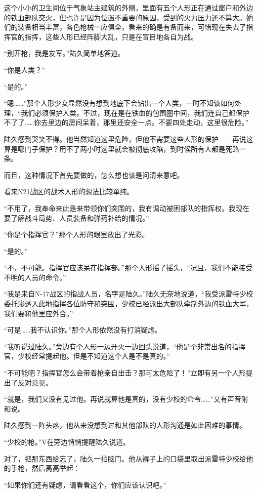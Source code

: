 这个小小的卫生间位于气象站主建筑的外侧，里面有五个人形正在通过窗户和外边的铁血部队交火，但也许是因为位置不重要的原因，受到的火力压力还不算大。她们的装备相当丰富，各色枪械一应俱全，看来的确是有备而来，可惜现在失去了指挥官的指挥，这些人形已经阵脚大乱，只是在盲目地各自为战。

“别开枪，我是友军。”陆久简单地答道。

“你是人类？”

“是的。”

“嗯……”那个人形少女显然没有想到地底下会钻出一个人类，一时不知该如何处理，“我们必须保护人类。不过，现在是在铁血的包围圈中间，我们连自己都保护不了了……你去里边的房间呆着，那里还安全一点。不要四处走动，这里很危险。”

陆久感到哭笑不得。他当然知道这里危险，但他不需要这些人形的保护——再说这算是哪门子保护？用不了两小时这里就会被彻底攻陷，到时候所有人都是死路一条。

而且，这种情况下首先要做的，怎么想也该是问清来意吧。

看来N21战区的战术人形的想法比较单纯。

“不用了，我奉命来此是来带领你们突围的，我有调动被困部队的指挥权。我现在要了解战斗局势、人员装备和弹药补给的情况。”

“你是个指挥官？”那个人形的眼里放出了光彩。

“是的。”

“不，不可能。指挥官应该呆在指挥部。”那个人形摇了摇头，“况且，我们不能接受不明的人员的命令。”

“我是来自N-17战区的指战人员，名字是陆久。”陆久无奈地说道，“我受派雷特少校委托渗透入此地指挥各位防守和突围，少校已经派出大部队牵制外边的铁血大军，我们要和他里应外合。”

“可是……我不认识你。”那个人形依然没有打消疑虑。

“我听说过陆久。”旁边有个人形一边开火一边回头说道，“他是个非常出名的指挥官，少校经常提起他。但是不知道这个人是不是真的。”

“不可能吧？指挥官怎么会带着枪亲自出击？那可太危险了！”立即有另一个人形提出了反对意见。

“就是，我们又没有见过他。再说就算他是真的，没有少校的命令……”又有声音附和说。

陆久感到一阵头疼，他从来没想到过和其他部队的人形沟通是如此困难的事情。

“少校的枪。”V在旁边悄悄提醒陆久说道。

对了，把那东西给忘了，陆久一拍脑门。他从裤子上的口袋里取出派雷特少校给他的手枪，然后高高举起：

“如果你们还有疑虑，请看看这个，你们应该认识吧。”

